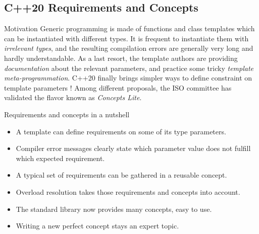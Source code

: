 \subsection[tmpl]{C++20 Requirements and Concepts}

\begin{frame}[fragile]
  \begin{block}{Motivation}
    Generic programming is made of functions and class templates
    which can be instantiated with different types. It is frequent
    to instantiate them with {\em irrelevant types}, and the resulting
    compilation errors are generally very long and hardly understandable.
    As a last resort, the template authors are providing {\em documentation}
    about the relevant parameters, and practice some tricky
    {\em template meta-programmation}. C++20 finally brings simpler ways to
    define constraint on template parameters ! Among different proposals,
    the ISO committee has validated the flavor known as {\em Concepts Lite}.
  \end{block}
\end{frame}

\begin{frame}[fragile]
  \begin{block}{Requirements and concepts in a nutshell}
    \begin{itemize}
    \item A template can define requirements on some of its type parameters.
    \item Compiler error messages clearly state which parameter value does not fulfill which expected requirement.
    \item A typical set of requirements can be gathered in a reusable concept.
    \item Overload resolution takes those requirements and concepts into account.
    \item The standard library now provides many concepts, easy to use.
    \item Writing a new perfect concept stays an expert topic.
    \end{itemize}
  \end{block}
\end{frame}


